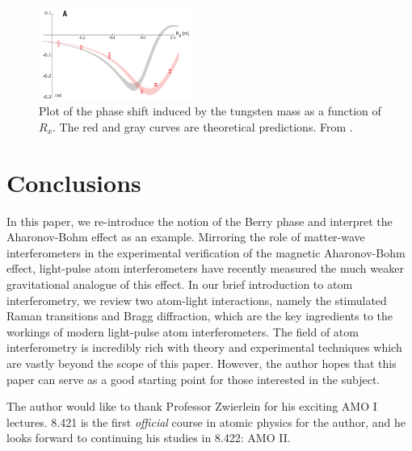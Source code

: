 \documentclass[reprint,
nofootinbib,
amsmath,amssymb,
aps]{revtex4-1}
\begin{document}
\begin{figure}
	\includegraphics[width=0.45\textwidth]{52hbark_edited.png}
	\caption{Plot of the phase shift induced by the tungsten mass as a function of $R_x$. The red and gray curves are theoretical predictions. From \cite{overstreet2022observation}.}
	\label{fig:data}
\end{figure}







\section{Conclusions}


In this paper, we re-introduce the notion of the Berry phase and interpret the Aharonov-Bohm effect as an example. Mirroring the role of matter-wave interferometers in the experimental verification of the magnetic Aharonov-Bohm effect, light-pulse atom interferometers have recently measured the much weaker gravitational analogue of this effect. In our brief introduction to atom interferometry, we review two atom-light interactions, namely the stimulated Raman transitions and Bragg diffraction, which are the key ingredients to the workings of modern light-pulse atom interferometers. The field of atom interferometry is incredibly rich with theory and experimental techniques which are vastly beyond the scope of this paper. However, the author hopes that this paper can serve as a good starting point for those interested in the subject. 



\begin{acknowledgments}
	The author would like to thank Professor Zwierlein for his exciting AMO I lectures. 8.421 is the first \textit{official} course in atomic physics for the author, and he looks forward to continuing his studies in 8.422: AMO II. 
\end{acknowledgments}



\end{document}
